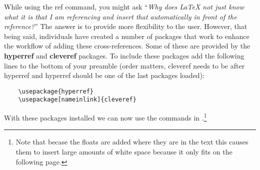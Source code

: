       While using the ref command, you might ask \enquote{\textit{Why does \LaTeX{} not just know what it is that I am referencing and insert that automatically in front of the reference?}}
      The answer is to provide more flexibility to the user.
      However, that being said, individuals have created a number of packages that work to enhance the workflow of adding these cross-references.
      Some of these are provided by the \textbf{hyperref} and \textbf{cleveref} packages.
      To include these packages add the following lines to the bottom of your preamble (order matters, cleveref needs to be after hyperref and hyperref should be one of the last packages loaded):
      \begin{verbatim}
    \usepackage{hyperref}
    \usepackage[nameinlink]{cleveref}\end{verbatim}
      With these packages installed we can now use the commands in .\footnote{Note that becase the floats are added where they are in the text this causes them to insert large amounts of white space because it only fits on the following page.}
